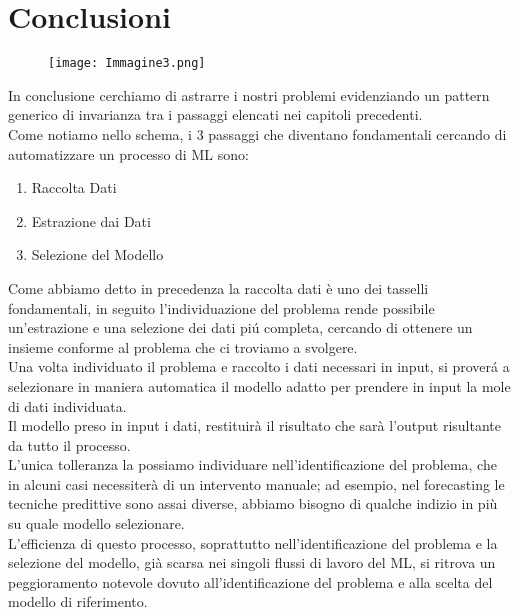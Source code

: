 \documentclass[../tesi.tex]{subfiles}
\begin{document}
  \section{Conclusioni}
\begin{figure}[htbp]
  \centering
  \texttt{[image: Immagine3.png]} 
  \end{figure}
In conclusione cerchiamo di astrarre i nostri problemi evidenziando un pattern generico di invarianza tra i passaggi elencati nei capitoli precedenti.\\
Come notiamo nello schema, i 3 passaggi che diventano fondamentali cercando di automatizzare un processo di ML sono:
\begin{enumerate}
  \item Raccolta Dati
  \item Estrazione dai Dati 
  \item Selezione del Modello
\end{enumerate}
Come abbiamo detto in precedenza la raccolta dati è uno dei tasselli fondamentali, in seguito l’individuazione del problema rende possibile un'estrazione e una selezione dei dati piú completa, cercando di ottenere un insieme conforme al problema che ci troviamo a svolgere.\\
Una volta individuato il problema e raccolto i dati necessari in input, si proverá a selezionare in maniera automatica il modello adatto per prendere in input la mole di dati individuata.\\
Il modello preso in input i dati, restituirà il risultato che sarà l’output risultante da tutto il processo.\\
L’unica tolleranza la possiamo individuare nell’identificazione del problema, che in alcuni casi necessiterà di un intervento manuale; ad esempio, nel forecasting le tecniche predittive sono assai diverse, abbiamo bisogno di qualche indizio in più su quale modello selezionare.\\
L’efficienza di questo processo, soprattutto nell’identificazione del problema e la selezione del modello, già scarsa nei singoli flussi di lavoro del ML, si ritrova un peggioramento notevole dovuto all’identificazione del problema e alla scelta del modello di riferimento.
\end{document}
